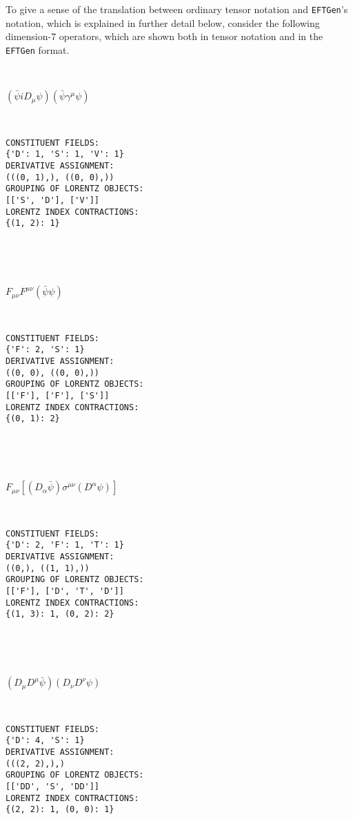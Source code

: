 \documentclass[11pt,BCOR=5mm]{article}
\begin{document}
To give a sense of the translation between ordinary tensor notation and \texttt{EFTGen}'s notation, which is explained in further detail below, consider the following dimension-7 operators, which are shown both in tensor notation and in the \texttt{EFTGen} format.

\

$(\bar{\psi} iD_{\mu} \psi)(\bar{\psi} \gamma^{\mu} \psi)$

\

\begin{lstlisting}[numbers=none]
CONSTITUENT FIELDS: 
{'D': 1, 'S': 1, 'V': 1}
DERIVATIVE ASSIGNMENT: 
(((0, 1),), ((0, 0),))
GROUPING OF LORENTZ OBJECTS: 
[['S', 'D'], ['V']]
LORENTZ INDEX CONTRACTIONS: 
{(1, 2): 1}
\end{lstlisting}

\

\

$F_{\mu \nu}F^{\mu \nu}(\bar{\psi} \psi)$

\

\begin{lstlisting}[numbers=none]
CONSTITUENT FIELDS: 
{'F': 2, 'S': 1}
DERIVATIVE ASSIGNMENT: 
((0, 0), ((0, 0),))
GROUPING OF LORENTZ OBJECTS: 
[['F'], ['F'], ['S']]
LORENTZ INDEX CONTRACTIONS: 
{(0, 1): 2}
\end{lstlisting}

\

\

$F_{\mu \nu}[(D_{\alpha} \bar{\psi}) \sigma^{\mu \nu} (D^{\alpha} \psi)]$

\

\begin{lstlisting}[numbers=none]
CONSTITUENT FIELDS: 
{'D': 2, 'F': 1, 'T': 1}
DERIVATIVE ASSIGNMENT: 
((0,), ((1, 1),))
GROUPING OF LORENTZ OBJECTS: 
[['F'], ['D', 'T', 'D']]
LORENTZ INDEX CONTRACTIONS: 
{(1, 3): 1, (0, 2): 2}
\end{lstlisting}

\

\

$(D_{\mu}D^{\mu}\bar{\psi})  (D_{\nu} D^{\nu} \psi) $

\

\begin{lstlisting}[numbers=none]
CONSTITUENT FIELDS: 
{'D': 4, 'S': 1}
DERIVATIVE ASSIGNMENT: 
(((2, 2),),)
GROUPING OF LORENTZ OBJECTS: 
[['DD', 'S', 'DD']]
LORENTZ INDEX CONTRACTIONS: 
{(2, 2): 1, (0, 0): 1}
\end{lstlisting}

\
\end{document}
